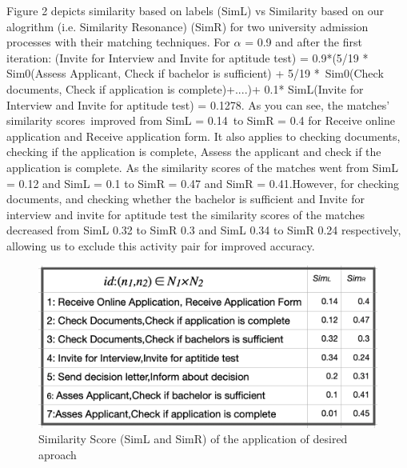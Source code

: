 \documentclass[runningheads]{llncs}
\begin{document}
Figure 2 depicts similarity based on labels (SimL) vs Similarity based on our alogrithm (i.e. Similarity Resonance) (SimR) for two university admission processes with their matching techniques. For $\alpha$ = 0.9 and after the first iteration: (Invite for Interview and Invite for aptitude test) = 0.9*(5/19 * Sim0(Assess Applicant, Check if bachelor is sufficient) + 5/19 * Sim0(Check documents, Check if application is complete)+....)+ 0.1* SimL(Invite for Interview and Invite for aptitude test) = 0.1278.
As you can see, the matches' similarity scores improved from SimL =  0.14 to SimR = 0.4 for Receive online application and Receive application form. It also applies to checking documents, checking if the application is complete, Assess the applicant and check if the application is complete. As the similarity scores of the matches went from SimL = 0.12 and SimL = 0.1 to SimR = 0.47 and SimR = 0.41.However, for checking documents, and checking whether the bachelor is sufficient and Invite for interview and invite for aptitude test the similarity scores of the matches decreased from SimL 0.32 to SimR 0.3 and SimL 0.34 to SimR 0.24 respectively, allowing us to exclude this activity pair for improved accuracy.
\begin{figure}
    \centering
    \includegraphics[width = \textwidth]{Figures/Fig_9.PNG}
    \caption{Similarity Score (SimL and SimR) of the application of desired aproach}
    \label{fig:9}
\end{figure}
\end{document}
